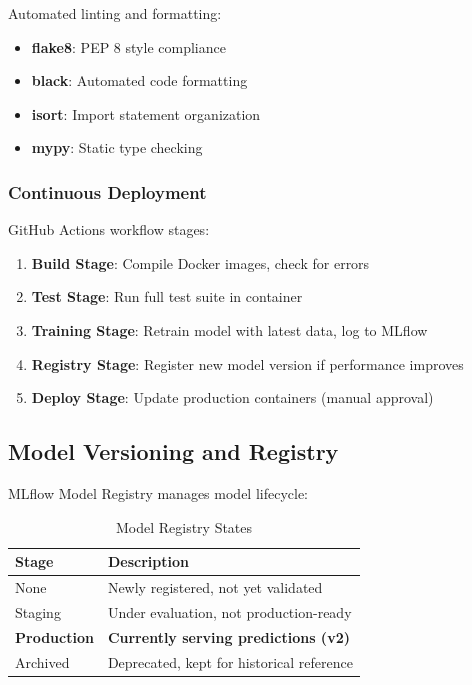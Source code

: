 Automated linting and formatting:

\begin{itemize}
    \item \textbf{flake8}: PEP 8 style compliance
    \item \textbf{black}: Automated code formatting
    \item \textbf{isort}: Import statement organization
    \item \textbf{mypy}: Static type checking
\end{itemize}

\subsubsection{Continuous Deployment}

GitHub Actions workflow stages:

\begin{enumerate}
    \item \textbf{Build Stage}: Compile Docker images, check for errors
    \item \textbf{Test Stage}: Run full test suite in container
    \item \textbf{Training Stage}: Retrain model with latest data, log to MLflow
    \item \textbf{Registry Stage}: Register new model version if performance improves
    \item \textbf{Deploy Stage}: Update production containers (manual approval)
\end{enumerate}

\subsection{Model Versioning and Registry}

MLflow Model Registry manages model lifecycle:

\begin{table}[h]
\centering
\caption{Model Registry States}
\begin{tabular}{lp{8cm}}
\toprule
\textbf{Stage} & \textbf{Description} \\
\midrule
None & Newly registered, not yet validated \\
Staging & Under evaluation, not production-ready \\
\textbf{Production} & \textbf{Currently serving predictions (v2)} \\
Archived & Deprecated, kept for historical reference \\
\bottomrule
\end{tabular}
\label{tab:model_stages}
\end{table}

